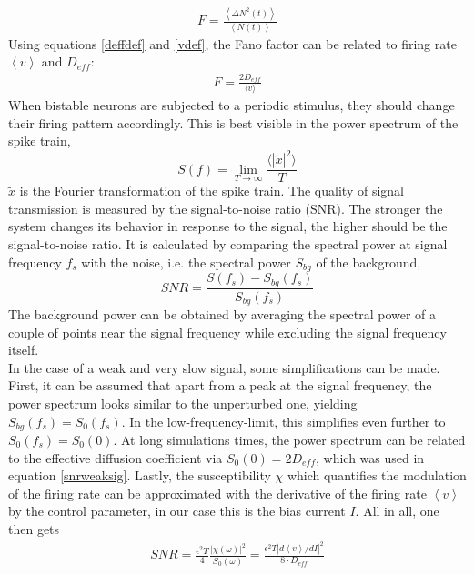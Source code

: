 \documentclass[12pt,a4paper]{article}
\begin{document}
\begin{align*}
F=\frac{\left\langle \Delta N^2(t) \right\rangle}{\left\langle N(t)\right\rangle}
\end{align*}
Using equations \ref{deffdef} and \ref{vdef}, the Fano factor can be related to firing rate $\left<v\right>$ and $D_{eff}$:
\begin{align*}
F=\frac{2D_{eff}}{\langle v\rangle}
\end{align*}
When bistable neurons are subjected to a periodic stimulus, they should change their firing pattern accordingly. This is best visible in the power spectrum of the spike train, 
\begin{equation}
S(f)=\lim_{T\rightarrow\infty}\frac{\langle|\tilde{x}|^2\rangle}{T}
\end{equation}
$\tilde{x}$ is the Fourier transformation of the spike train. The quality of signal transmission is measured by the signal-to-noise ratio (SNR). The stronger the system changes its behavior in response to the signal, the higher should be the signal-to-noise ratio. It is calculated by comparing the spectral power at signal frequency $f_s$ with the noise, i.e. the spectral power $S_{bg}$ of the background,
\begin{equation}
SNR=\frac{S(f_{s})-S_{bg}(f_{s})}{S_{bg}(f_{s})}
\end{equation}
The background power can be obtained by averaging the spectral power of a couple of points near the signal frequency while excluding the signal frequency itself. 
\\
In the case of a weak and very slow signal, some simplifications can be made. First, it can be assumed that apart from a peak at the signal frequency, the power spectrum looks similar to the unperturbed one, yielding $S_{bg}(f_s)=S_0(f_s)$. In the low-frequency-limit, this simplifies even further to $S_{0}(f_s)=S_0(0)$. At long simulations times, the power spectrum can be related to the effective diffusion coefficient via $S_0(0)=2D_{eff}$\cite{deffspec}, which was used in equation \ref{snrweaksig}. Lastly, the susceptibility $\chi$ which quantifies the modulation of the firing rate can be approximated with the derivative of the firing rate $\left<v\right>$ by the control parameter, in our case this is the bias current $I$. All in all, one then gets
\begin{align}\label{snrweaksig}
SNR=\frac{\epsilon ^2T}{4}\frac{|\chi(\omega)|^2}{S_0(\omega)}=\frac{\epsilon^2T|d\left<v\right>/dI|^2}{8\cdot D_{eff}}
\end{align}
\end{document}
